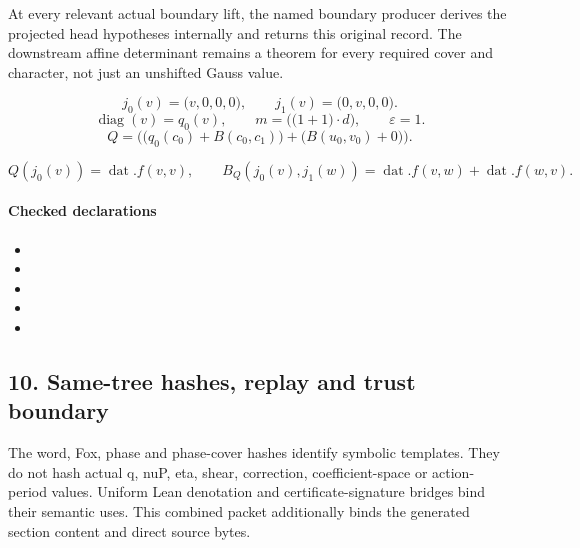 At every relevant actual boundary lift, the named boundary producer derives the projected head hypotheses internally and returns this original record. The downstream affine determinant remains a theorem for every required cover and character, not just an unshifted Gauss value.

\[j_0(v)=\bigl(v,0,0,0\bigr),\qquad j_1(v)=\bigl(0,v,0,0\bigr).\]
\[\operatorname{diag}(v)=q_0(v),\qquad m=\bigl(\bigl(1+1\bigr)\cdot d\bigr),\qquad \varepsilon=1.\]
\[Q=\bigl(\bigl(q_0(c_0)+B(c_0,c_1)\bigr)+\bigl(B(u_{0},v_{0})+0\bigr)\bigr).\]

\[Q(j_0(v))=\operatorname{dat}.f(v,v),\qquad B_Q(j_0(v),j_1(w))=\operatorname{dat}.f(v,w)+\operatorname{dat}.f(w,v).\]
\paragraph{Checked declarations}
\begin{itemize}
\item {}
\item {}
\item {}
\item {}
\item {}
\end{itemize}

\subsection*{10. Same-tree hashes, replay and trust boundary}
The word, Fox, phase and phase-cover hashes identify symbolic templates. They do not hash actual q, nuP, eta, shear, correction, coefficient-space or action-period values. Uniform Lean denotation and certificate-signature bridges bind their semantic uses. This combined packet additionally binds the generated section content and direct source bytes.

